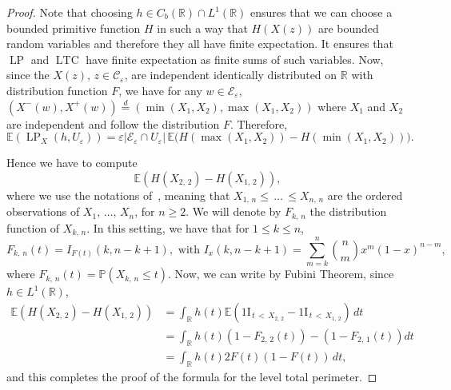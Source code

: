 \documentclass[AHL,Unicode,longabstracts,published]{cedram}
\newcommand{\R}{\mathbb{R}}
\newcommand{\bbP}{\mathbb{P}}
\newcommand{\E}{\mathbb{E}}
\newcommand{\ind}{{1\!\!\mathrm{I}}}
\newcommand{\eps}{\varepsilon}
\DeclareMathOperator{\LTC}{LTC}
\DeclareMathOperator{\LP}{LP}
\newcommand{\calC}{\mathcal{C}}
\newcommand{\calE}{\mathcal{E}}
\begin{document}
\begin{proof}
Note that choosing $h \in C_b(\R)\cap L^1(\R)$ ensures that we can choose a bounded primitive function $H$ in such a way that $H(X(z))$ are
bounded random variables and therefore they all have finite expectation. It ensures that $\LP$ and $\LTC$ have finite expectation as finite sums of such variables. Now, since the $X(z)$, $z\in\calC_\eps$, are independent identically distributed on $\R$ with distribution function $F$, we have for any $w\in \calE_\eps$, $(X^-(w),X^+(w))\stackrel{d}{=}(\min(X_1,X_2),\max(X_1,X_2))$ where $X_1$ and $X_2$ are independent and follow the distribution $F$. Therefore,
\[
\E\left(\LP_X(h,U_\eps)\right) = \eps\left|\calE_\eps\cap U_\eps\right| \, \E\big(H\left(\max\left(X_1,X_2\right)\right) -
H\left(\min\left(X_1,X_2\right)\right)\big).
\]

Hence we have to compute
\[
\E\left(H(X_{2,\,2})-H(X_{1,\,2})\right),
\]
where we use the notations of~\cite{Nevzorov}, meaning that $X_{1,\,n}\le\,\ldots\,\le X_{n,\,n}$ are the ordered observations of $X_1,\,\ldots,\,X_n$, for $n\ge 2$. We will denote by $F_{k,\,n}$ the distribution function of $X_{k,\,n}$. In this setting, we have that for $1\le k\le n$,
\[
F_{k,\,n}(t)=I_{F(t)}(k,n-k+1), \text{ with } I_x(k,n-k+1)=\sum_{m=k}^n
\binom{n}{m}
x^m(1-x)^{n-m},
\]
where $F_{k,\,n}(t)=\bbP(X_{k,\,n}\le t)$. Now, we can write by Fubini Theorem, since $h\in L^1(\R)$,
\begin{align*}
\E\left(H(X_{2,\,2}) - H(X_{1,\,2})\right) & = \int_\R h(t) \E \left(
\ind_{\,t\,<\,X_{2,\,2}}-\ind_{\,t\,<\, X_{1,\,2}}\right) \, dt \\
& = \int_\R h(t) \left(1-F_{{2,\,2}}(t)\right)-\left(1-F_{{2,\,1}}(t)\right)dt\\
& = \int_\R h(t) 2 F (t) (1- F(t)) \, dt,
\end{align*}
and this completes the proof of the formula for the level total perimeter.


\end{proof}
\end{document}
